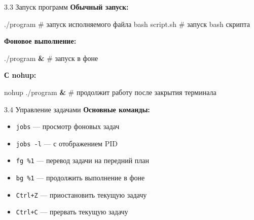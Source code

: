 \documentclass[
  ignorenonframetext,
  aspectratio=169,
  russian,
]{beamer}
\newenvironment{Shaded}{\begin{snugshade}}{\end{snugshade}}
\newcommand{\CommentTok}[1]{\textcolor[rgb]{0.37,0.37,0.37}{#1}}
\newcommand{\ExtensionTok}[1]{\textcolor[rgb]{0.00,0.23,0.31}{#1}}
\newcommand{\FunctionTok}[1]{\textcolor[rgb]{0.28,0.35,0.67}{#1}}
\newcommand{\KeywordTok}[1]{\textcolor[rgb]{0.00,0.23,0.31}{\textbf{#1}}}
\newcommand{\NormalTok}[1]{\textcolor[rgb]{0.00,0.23,0.31}{#1}}
\providecommand{\tightlist}{%
  \setlength{\itemsep}{0pt}\setlength{\parskip}{0pt}}
\begin{document}
\begin{frame}[fragile]{3.3 Запуск программ}
\label{ux437ux430ux43fux443ux441ux43a-ux43fux440ux43eux433ux440ux430ux43cux43c}
\textbf{Обычный запуск:}

\begin{Shaded}
\begin{Highlighting}[]
\ExtensionTok{./program}          \CommentTok{\# запуск исполняемого файла}
\FunctionTok{bash}\NormalTok{ script.sh     }\CommentTok{\# запуск bash скрипта}
\end{Highlighting}
\end{Shaded}

\textbf{Фоновое выполнение:}

\begin{Shaded}
\begin{Highlighting}[]
\ExtensionTok{./program} \KeywordTok{\&}        \CommentTok{\# запуск в фоне}
\end{Highlighting}
\end{Shaded}

\textbf{С nohup:}

\begin{Shaded}
\begin{Highlighting}[]
\FunctionTok{nohup}\NormalTok{ ./program }\KeywordTok{\&}  \CommentTok{\# продолжит работу после закрытия терминала}
\end{Highlighting}
\end{Shaded}
\end{frame}

\begin{frame}[fragile]{3.4 Управление задачами}
\label{ux443ux43fux440ux430ux432ux43bux435ux43dux438ux435-ux437ux430ux434ux430ux447ux430ux43cux438}
\textbf{Основные команды:}

\begin{itemize}[<+->]
\tightlist
\item
  \texttt{jobs} --- просмотр фоновых задач
\item
  \texttt{jobs\ -l} --- с отображением PID
\item
  \texttt{fg\ \%1} --- перевод задачи на передний план
\item
  \texttt{bg\ \%1} --- продолжить выполнение в фоне
\item
  \texttt{Ctrl+Z} --- приостановить текущую задачу
\item
  \texttt{Ctrl+C} --- прервать текущую задачу
\end{itemize}
\end{frame}
\end{document}
